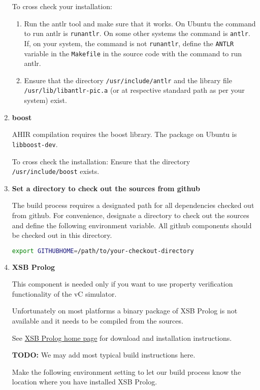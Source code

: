 \documentclass[12pt,a4paper]{article}
\begin{document}
\begin{enumerate}
To cross check your installation:

\begin{enumerate}
\item Run the antlr tool and make sure that it works. On Ubuntu the command to run antlr is \texttt{runantlr}. On some other systems the command is \texttt{antlr}. If, on your system, the command is not \texttt{runantlr}, define the \texttt{ANTLR} variable in the \texttt{Makefile} in the source code with the command to run antlr.

\item Ensure that the directory \texttt{/usr/include/antlr} and the library file \texttt{/usr/lib/libantlr-pic.a} (or at respective standard path as per your system) exist.
\end{enumerate}

\item \textbf{boost}

AHIR compilation requires the boost library. The package on Ubuntu is \texttt{libboost-dev}.

To cross check the installation: Ensure that the directory \texttt{/usr/include/boost} exists.

\item \textbf{Set a directory to check out the sources from github}

The build process requires a designated path for all dependencies checked out from github. For convenience, designate a directory to check out the sources and define the following environment variable. All github components should be checked out in this directory.

\begin{lstlisting}[language=bash,style=snippet]
export GITHUBHOME=/path/to/your-checkout-directory
\end{lstlisting}

\item \textbf{XSB Prolog}

This component is needed only if you want to use property verification functionality of the vC simulator.

Unfortunately on most platforms a binary package of XSB Prolog is not available and it needs to be compiled from the sources.

See \href{http://xsb.sourceforge.net}{XSB Prolog home page} for download and installation instructions.

\textbf{TODO:} We may add most typical build instructions here.

Make the following environment setting to let our build process know the location where you have installed XSB Prolog.


\end{enumerate}
\end{document}
